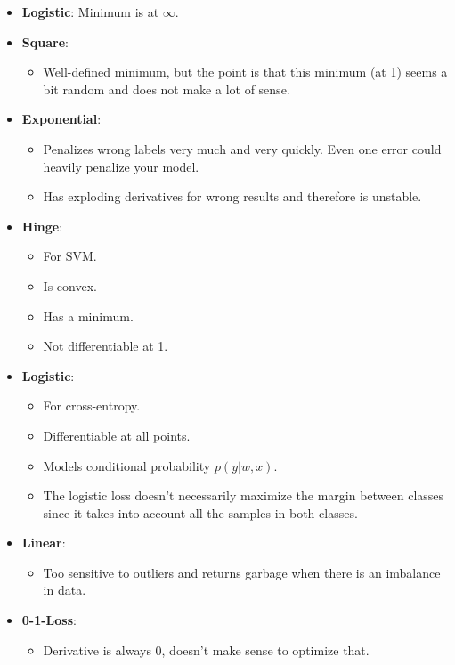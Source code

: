 \documentclass{article}
\begin{document}
\begin{itemize}
    \item \textbf{Logistic}: Minimum is at $\infty$.
    \item \textbf{Square}:
    \begin{itemize}
        \item Well-defined minimum, but the point is that this minimum (at 1) seems a bit random and does not make a lot of sense.
    \end{itemize}
    \item \textbf{Exponential}:
    \begin{itemize}
        \item Penalizes wrong labels very much and very quickly. Even one error could heavily penalize your model.
        \item Has exploding derivatives for wrong results and therefore is unstable.
    \end{itemize}
    \item \textbf{Hinge}:
    \begin{itemize}
        \item For SVM.
        \item Is convex.
        \item Has a minimum.
        \item Not differentiable at 1.
    \end{itemize}
    \item \textbf{Logistic}:
    \begin{itemize}
        \item For cross-entropy.
        \item Differentiable at all points.
        \item Models conditional probability $p(y | w, x)$.
        \item The logistic loss doesn't necessarily maximize the margin between classes since it takes into account all the samples in both classes.
    \end{itemize}
    \item \textbf{Linear}:
    \begin{itemize}
        \item Too sensitive to outliers and returns garbage when there is an imbalance in data.
    \end{itemize}
    \item \textbf{0-1-Loss}:
    \begin{itemize}
        \item Derivative is always 0, doesn't make sense to optimize that.

\end{itemize}
\end{itemize}
\end{document}
